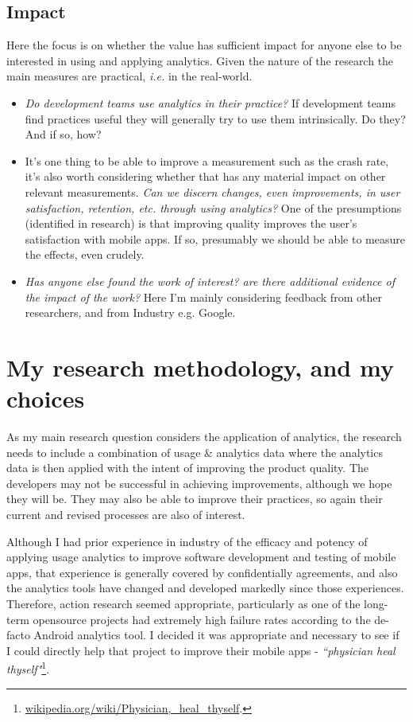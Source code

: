 \subsection{Impact}
Here the focus is on whether the value has sufficient impact for anyone else to be interested in using and applying analytics. Given the nature of the research the main measures are practical, \emph{i.e.} in the real-world.
\begin{itemize}
    \item \emph{Do development teams use analytics in their practice?} If development teams find practices useful they will generally try to use them intrinsically. Do they? And if so, how?
    \item It's one thing to be able to improve a measurement such as the crash rate, it's also worth considering whether that has any material impact on other relevant measurements. \emph{Can we discern changes, even improvements, in user satisfaction, retention, etc. through using analytics?} One of the presumptions (identified in research) is that improving quality improves the user's satisfaction with mobile apps. If so, presumably we should be able to measure the effects, even crudely.
    \item \emph{Has anyone else found the work of interest? are there additional evidence of the impact of the work?} Here I'm mainly considering feedback from other researchers, and from Industry e.g. Google.
\end{itemize}

\section{My research methodology, and my choices}
As my main research question considers the application of analytics, the research needs to include a combination of usage \& analytics data where the analytics data is then applied with the intent of improving the product quality. The developers may not be successful in achieving improvements, although we hope they will be. They may also be able to improve their practices, so again their current and revised processes are also of interest.

Although I had prior experience in industry of the efficacy and potency of applying usage analytics to improve software development and testing of mobile apps, that experience is generally covered by confidentially agreements, and also the analytics tools have changed and developed markedly since those experiences. Therefore, action research seemed appropriate, particularly as one of the long-term opensource projects had extremely high failure rates according to the de-facto Android analytics tool. I decided it was appropriate and necessary to see if I could directly help that project to improve their mobile apps - \emph{``physician heal thyself"}\footnote{\href{https://en.wikipedia.org/wiki/Physician,\_heal\_thyself}{wikipedia.org/wiki/Physician,\_heal\_thyself}.}.


